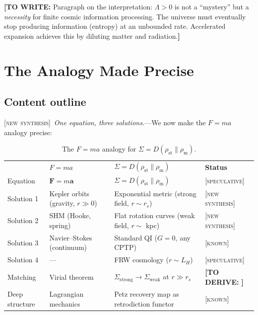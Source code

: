 \documentclass[prl,twocolumn,superscriptaddress,longbibliography,floatfix]{revtex4-2}
\newcommand{\known}{\textsc{[known]}}
\newcommand{\newsyn}{\textsc{[new synthesis]}}
\newcommand{\spec}{\textsc{[speculative]}}
\newcommand{\towrite}[1]{{\color{blue}\textbf{[TO WRITE:} #1\textbf{]}}}
\newcommand{\toderive}[1]{{\color{red}\textbf{[TO DERIVE:} #1\textbf{]}}}
\begin{document}
\towrite{Paragraph on the interpretation: $\Lambda > 0$ is not
a ``mystery'' but a \emph{necessity} for finite cosmic information
processing. The universe must eventually stop producing
information (entropy) at an unbounded rate. Accelerated
expansion achieves this by diluting matter and radiation.}

\section{The Analogy Made Precise}
\label{sec:analogy}

\subsection*{Content outline}

\newsyn\ \emph{One equation, three solutions.}---We now make
the $F = ma$ analogy precise:

\begin{table}[htbp]
\caption{\label{tab:analogy}The $F = ma$ analogy for
$\Sigma = D(\rho_{\mathrm{st}} \| \rho_{\mathrm{m}})$.}
\begin{ruledtabular}
\begin{tabular}{p{3cm}p{3.5cm}p{3.5cm}p{3.5cm}}
& \textbf{$F = ma$} & \textbf{$\Sigma = D(\rho_{\mathrm{st}} \| \rho_{\mathrm{m}})$} & \textbf{Status} \\
\colrule
Equation & $\mathbf{F} = m\mathbf{a}$ & $\Sigma = D(\rho_{\mathrm{st}} \| \rho_{\mathrm{m}})$ & \spec \\[4pt]
Solution 1 & Kepler orbits (gravity, $r \gg 0$) & Exponential metric (strong field, $r \sim r_s$) & \newsyn \\[4pt]
Solution 2 & SHM (Hooke, spring) & Flat rotation curves (weak field, $r \sim$ kpc) & \newsyn \\[4pt]
Solution 3 & Navier--Stokes (continuum) & Standard QI ($G = 0$, any CPTP) & \known \\[4pt]
Solution 4 & --- & FRW cosmology ($r \sim L_H$) & \spec \\[4pt]
Matching & Virial theorem & $\Sigma_{\mathrm{strong}} \to \Sigma_{\mathrm{weak}}$ at $r \gg r_s$ & \toderive{} \\[4pt]
Deep structure & Lagrangian mechanics & Petz recovery map as retrodiction functor & \known \\
\end{tabular}
\end{ruledtabular}
\end{table}
\end{document}
